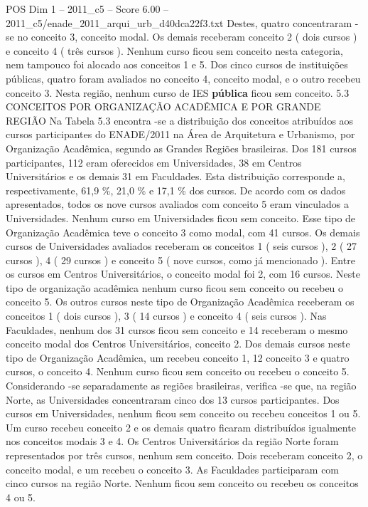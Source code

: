 \begin{textsample}{POS Dim 1 – 2011\_c5 – Score 6.00 – 2011\_c5/enade\_2011\_arqui\_urb\_d40dca22f3.txt}
Destes, quatro concentraram -se no conceito 3, conceito modal.
Os demais receberam conceito 2 ( dois cursos ) e conceito 4 ( três cursos ).
Nenhum curso ficou sem conceito nesta categoria, nem tampouco foi alocado aos conceitos 1 e 5.
Dos cinco cursos de instituições públicas, quatro foram avaliados no conceito 4, conceito modal, e o outro recebeu conceito 3.
Nesta região, nenhum curso de IES \textbf{pública} ficou sem conceito. 5.3 CONCEITOS POR ORGANIZAÇÃO ACADÊMICA E POR GRANDE REGIÃO Na Tabela 5.3 encontra -se a distribuição dos conceitos atribuídos aos cursos participantes do ENADE/2011 na Área de Arquitetura e Urbanismo, por Organização Acadêmica, segundo as Grandes Regiões brasileiras.
Dos 181 cursos participantes, 112 eram oferecidos em Universidades, 38 em Centros Universitários e os demais 31 em Faculdades.
Esta distribuição corresponde a, respectivamente, 61,9 \%, 21,0 \% e 17,1 \% dos cursos.
De acordo com os dados apresentados, todos os nove cursos avaliados com conceito 5 eram vinculados a Universidades.
Nenhum curso em Universidades ficou sem conceito.
Esse tipo de Organização Acadêmica teve o conceito 3 como modal, com 41 cursos.
Os demais cursos de Universidades avaliados receberam os conceitos 1 ( seis cursos ), 2 ( 27 cursos ), 4 ( 29 cursos ) e conceito 5 ( nove cursos, como já mencionado ).
Entre os cursos em Centros Universitários, o conceito modal foi 2, com 16 cursos.
Neste tipo de organização acadêmica nenhum curso ficou sem conceito ou recebeu o conceito 5.
Os outros cursos neste tipo de Organização Acadêmica receberam os conceitos 1 ( dois cursos ), 3 ( 14 cursos ) e conceito 4 ( seis cursos ).
Nas Faculdades, nenhum dos 31 cursos ficou sem conceito e 14 receberam o mesmo conceito modal dos Centros Universitários, conceito 2.
Dos demais cursos neste tipo de Organização Acadêmica, um recebeu conceito 1, 12 conceito 3 e quatro cursos, o conceito 4.
Nenhum curso ficou sem conceito ou recebeu o conceito 5.
Considerando -se separadamente as regiões brasileiras, verifica -se que, na região Norte, as Universidades concentraram cinco dos 13 cursos participantes.
Dos cursos em Universidades, nenhum ficou sem conceito ou recebeu conceitos 1 ou 5.
Um curso recebeu conceito 2 e os demais quatro ficaram distribuídos igualmente nos conceitos modais 3 e 4.
Os Centros Universitários da região Norte foram representados por três cursos, nenhum sem conceito.
Dois receberam conceito 2, o conceito modal, e um recebeu o conceito 3.
As Faculdades participaram com cinco cursos na região Norte.
Nenhum ficou sem conceito ou recebeu os conceitos 4 ou 5.

\end{textsample}
